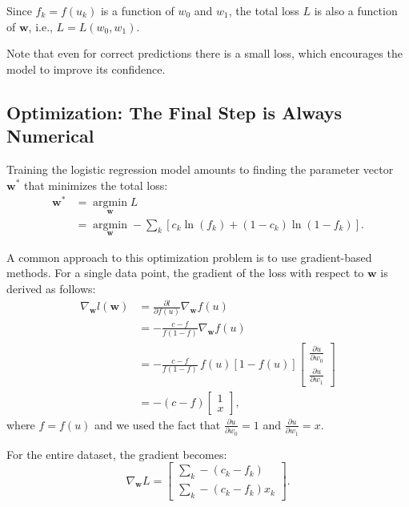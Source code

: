 \documentclass[12pt]{article}
\begin{document}
Since $f_k=f(u_k)$ is a function of $w_0$ and $w_1$, the total loss $L$ is also a function of $\bm{w}$, i.e., $L = L(w_0, w_1)$.

Note that even for correct predictions there is a small loss, which encourages the model to improve its confidence.

\subsection{Optimization: The Final Step is Always Numerical}
Training the logistic regression model amounts to finding the parameter vector $\bm{w}^*$ that minimizes the total loss:
\begin{equation} 
\begin{split}
        \bm{w}^* & = \operatorname*{argmin}_{\bm{w}} L \\
        & = \operatorname*{argmin}_{\bm{w}} -\sum_k \left[ c_k \ln(f_k) + (1-c_k) \ln(1-f_k) \right].
\end{split}
\end{equation}

A common approach to this optimization problem is to use gradient-based methods. For a single data point, the gradient of the loss with respect to $\bm{w}$ is derived as follows:
\begin{equation}
\begin{split}
    \nabla_{\bm{w}} l(\bm{w}) & = \frac{\partial l}{\partial f(u)} \nabla_{\bm{w}} f(u) \\
    & = -\frac{c-f}{f(1-f)} \nabla_{\bm{w}} f(u) \\
    & = -\frac{c-f}{f(1-f)} \, f(u)[1-f(u)] \begin{bmatrix}
      \frac{\partial u}{\partial w_0} \\
      \frac{\partial u}{\partial w_1}
\end{bmatrix} \\
& = -(c-f)  \begin{bmatrix}
      1 \\
      x
\end{bmatrix},
\end{split}
\label{t04eq14}
\end{equation}
where $f=f(u)$ and we used the fact that $\frac{\partial u}{\partial w_0} = 1$ and $\frac{\partial u}{\partial w_1} = x$. 

For the entire dataset, the gradient becomes:
\begin{equation}
    \nabla_{\bm{w}} L = 
    \begin{bmatrix}
    \sum_k -(c_k - f_k) \\
    \sum_k -(c_k - f_k)x_k
    \end{bmatrix}.
    \label{t04eq15}
\end{equation}
\end{document}
